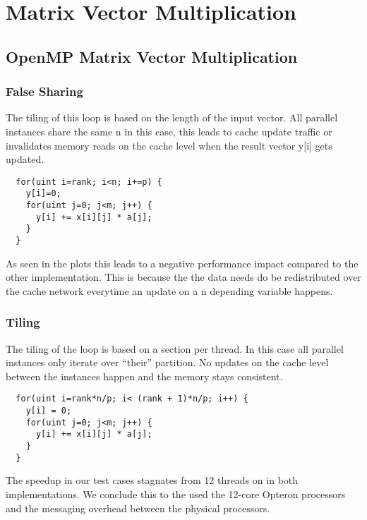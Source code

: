 \chapter{Matrix Vector Multiplication}
\section{OpenMP Matrix Vector Multiplication}
\falsesharingvarprocsA
{}\tilingvarprocsA

\subsection{False Sharing}

The tiling of this loop is based on the length of the input vector.
All parallel instances share the same n in this case, this leads to cache update traffic or invalidates memory reads on the cache level when the result vector y[i] gets updated.

\begin{lstlisting}
  for(uint i=rank; i<n; i+=p) {
    y[i]=0;
    for(uint j=0; j<m; j++) {
      y[i] += x[i][j] * a[j];
    }
  }
\end{lstlisting}

As seen in the plots this leads to a negative performance impact compared to the other implementation.
This is because the the data needs do be redistributed over the cache network everytime an update on a n depending variable happens.

\subsection{Tiling}

The tiling of the loop is based on a section per thread.
In this case all parallel instances only iterate over ``their'' partition. No updates on the cache level between the instances happen and the memory stays consistent.

\begin{lstlisting}
  for(uint i=rank*n/p; i< (rank + 1)*n/p; i++) {
    y[i] = 0;
    for(uint j=0; j<m; j++) {
      y[i] += x[i][j] * a[j];
    }
  }
\end{lstlisting}

The speedup in our test cases  stagnates from 12 threads on in both implementations.
We conclude this to the used the 12-core Opteron processors and the messaging overhead between the physical processors.\\


